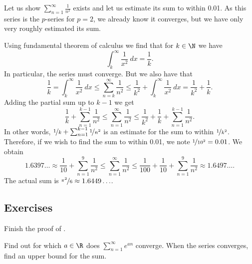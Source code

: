 \documentclass[12pt]{book}
\begin{document}
\begin{example}
Let us show $\sum_{n=1}^\infty \frac{1}{n^2}$ exists and let us
estimate its sum to within 0.01.
As this series is the $p$-series for
$p=2$, we already know it converges, but we have only very roughly
estimated its sum.

Using fundamental theorem of calculus we find that for $k \in \N$
we have
\begin{equation*}
\int_{k}^\infty \frac{1}{x^2}~dx = \frac{1}{k} .
\end{equation*}
In particular, the series must converge.
But we also have that
\begin{equation*}
\frac{1}{k} = \int_k^\infty \frac{1}{x^2}~dx
\leq
\sum_{n=k}^\infty \frac{1}{n^2}
\leq
\frac{1}{k^2}
+
\int_k^\infty \frac{1}{x^2}~dx
=
\frac{1}{k^2}
+
\frac{1}{k} .
\end{equation*}
Adding the partial sum up to $k-1$ we get
\begin{equation*}
\frac{1}{k} + \sum_{n=1}^{k-1} \frac{1}{n^2}
\leq
\sum_{n=1}^\infty \frac{1}{n^2}
\leq
\frac{1}{k^2}
+
\frac{1}{k} + \sum_{n=1}^{k-1} \frac{1}{n^2} .
\end{equation*}
In other words,
$\nicefrac{1}{k} + \sum_{n=1}^{k-1} \nicefrac{1}{n^2}$ is an estimate for
the sum to within $\nicefrac{1}{k^2}$.
Therefore, if we wish to
find the sum to within 0.01, we note $\nicefrac{1}{{10}^2} = 0.01$.
We
obtain
\begin{equation*}
1.6397\ldots
\approx
\frac{1}{10} + \sum_{n=1}^{9} \frac{1}{n^2}
\leq
\sum_{n=1}^\infty \frac{1}{n^2}
\leq
\frac{1}{100}
+
\frac{1}{10} + \sum_{n=1}^{9} \frac{1}{n^2}
\approx
1.6497\ldots .
\end{equation*}
The actual sum is $\nicefrac{\pi^2}{6} \approx 1.6449\ldots$. 
\end{example}

\subsection*{Exercises}

\begin{exercise}
Finish the proof of .
\end{exercise}

\begin{exercise}
Find out for which $a \in \R$ does $\sum\limits_{n=1}^\infty e^{an}$ converge.
When the series converges, find an upper bound for the sum.
\end{exercise}
\end{document}
